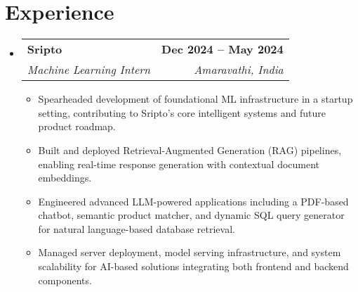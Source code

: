 \documentclass[letterpaper,11pt]{article}
\makeatletter
\newcommand{\resumeItem}[1]{
  \item\small{
    {#1 \vspace{-2pt}}
  }
}
\newcommand{\resumeSubheading}[4]{
  \vspace{-2pt}\item
    \begin{tabular*}{1.0\textwidth}[t]{l@{\extracolsep{\fill}}r}
      \textbf{#1} & \textbf{\small #2} \\
      \textit{\small#3} & \textit{\small #4} \\
    \end{tabular*}\vspace{-7pt}
}
\newcommand{\resumeSubHeadingListStart}{\begin{itemize}[leftmargin=0.0in, label={}]}
\newcommand{\resumeSubHeadingListEnd}{\end{itemize}}
\newcommand{\resumeItemListStart}{\begin{itemize}}
\newcommand{\resumeItemListEnd}{\end{itemize}\vspace{-5pt}}
\makeatother
\begin{document}
\section{Experience}
  \resumeSubHeadingListStart

    \resumeSubheading
      {Sripto}{Dec 2024 -- May 2024}
      {Machine Learning Intern}{Amaravathi, India}
      \resumeItemListStart
        \resumeItem{Spearheaded development of foundational ML infrastructure in a startup setting, contributing to Sripto’s core intelligent systems and future product roadmap.}
        \resumeItem{Built and deployed Retrieval-Augmented Generation (RAG) pipelines, enabling real-time response generation with contextual document embeddings.}
        \resumeItem{Engineered advanced LLM-powered applications including a PDF-based chatbot, semantic product matcher, and dynamic SQL query generator for natural language-based database retrieval.}
        \resumeItem{Managed server deployment, model serving infrastructure, and system scalability for AI-based solutions integrating both frontend and backend components.}
      \resumeItemListEnd

  \resumeSubHeadingListEnd
\vspace{-16pt}



\end{document}
